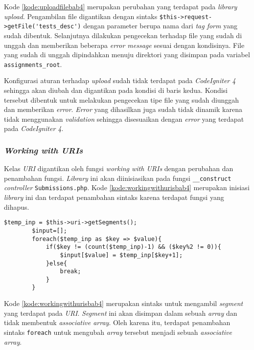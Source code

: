 Kode \ref{kode:uploadfilebab4} merupakan perubahan yang terdapat pada \textit{library upload}. Pengambilan file digantikan dengan sintaks \verb|$this->request->getFile('tests_desc')| dengan parameter berupa nama dari \textit{tag form} yang sudah dibentuk. Selanjutnya dilakukan pengecekan terhadap file yang sudah di unggah dan memberikan beberapa \textit{error message} sesuai dengan kondisinya. File yang sudah di unggah dipindahkan menuju direktori yang disimpan pada variabel \texttt{assignments\_root}. 

Konfigurasi aturan terhadap \textit{upload} sudah tidak terdapat pada \textit{CodeIgniter 4} sehingga akan diubah dan digantikan pada kondisi di baris kedua. Kondisi tersebut dibentuk untuk melakukan pengecekan tipe file yang sudah diunggah dan memberikan \textit{error}. \textit{Error} yang dihasilkan juga sudah tidak dinamik karena tidak menggunakan \textit{validation} sehingga disesuaikan dengan \textit{error} yang terdapat pada \textit{CodeIgniter 4}.

\subsubsection{\textit{Working with URIs}}
Kelas \textit{URI} digantikan oleh fungsi \textit{working with URIs} dengan perubahan dan penambahan fungsi. \textit{Library} ini akan diinisiasikan pada fungsi \texttt{\_\_construct} \textit{controller} \texttt{Submissions.php}. Kode \ref{kode:workingwithurisbab4} merupakan inisiasi \textit{library} ini dan terdapat penambahan sintaks karena terdapat fungsi yang dihapus.

\begin{lstlisting}[caption=Perancangan inisiasi dan penambahan sintaks \textit{library URIs} pada \texttt{\_\_construct}, label=kode:workingwithurisbab4]
$temp_inp = $this->uri->getSegments();
		$input=[];
		foreach($temp_inp as $key => $value){
			if($key != (count($temp_inp)-1) && ($key%2 != 0)){
				$input[$value] = $temp_inp[$key+1];	
			}else{
				break;
			}
		}
\end{lstlisting}
Kode \ref{kode:workingwithurisbab4} merupakan sintaks untuk mengambil \textit{segment} yang terdapat pada \textit{URI}. \textit{Segment} ini akan disimpan dalam sebuah \textit{array} dan tidak membentuk \textit{associative array}. Oleh karena itu, terdapat penambahan sintaks \texttt{foreach} untuk mengubah \textit{array} tersebut menjadi sebuah \textit{associative array}.

